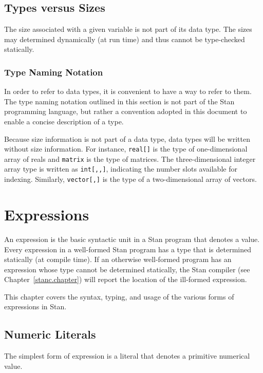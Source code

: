 \documentclass[10pt]{report}
\newcommand{\Stan}{Stan\xspace}
\newcommand{\code}[1]{{\tt #1}}
\newcommand{\refchapter}[1]{Chapter~\ref{#1.chapter}}
\begin{document}
\section{Types versus Sizes}

The size associated with a given variable is not part of its data
type.  The sizes may determined dynamically (at run time) and thus
cannot be type-checked statically.  

\subsection{Type Naming Notation}

In order to refer to data types, it is convenient to have a way to
refer to them.  The type naming notation outlined in this section is
not part of the \Stan programming language, but rather a convention
adopted in this document to enable a concise description of a type.

Because size information is not part of a data type, data
types will be written without size information.  For instance,
\code{real[]} is the type of one-dimensional array of reals and
\code{matrix} is the type of matrices.  The three-dimensional integer
array type is written as \code{int[,,]}, indicating the number slots
available for indexing.  Similarly, \code{vector[,]} is the type of a
two-dimensional array of vectors.





\chapter{Expressions}

An expression is the basic syntactic unit in a \Stan program that
denotes a value.  Every expression in a well-formed \Stan program has
a type that is determined statically (at compile time).  If an
otherwise well-formed program has an expression whose type cannot be
determined statically, the \Stan compiler (see \refchapter{stanc})
will report the location of the ill-formed expression.

This chapter covers the syntax, typing, and usage of the various forms
of expressions in \Stan. 

\section{Numeric Literals}

The simplest form of expression is a literal that denotes a primitive
numerical value.   
\end{document}

